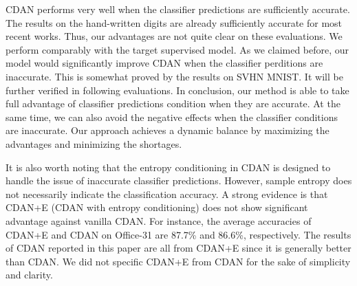 \documentclass[sigconf]{acmart}
\begin{document}
CDAN performs very well when the classifier predictions are sufficiently accurate. The results on the hand-written digits are already sufficiently accurate for most recent works. Thus, our advantages are not quite clear on these evaluations. We perform comparably with the target supervised model. As we claimed before, our model would significantly improve CDAN when the classifier perditions are inaccurate. This is somewhat proved by the results on SVHN MNIST. It will be further verified in following evaluations. In conclusion, our method is able to take full advantage of classifier predictions condition when they are accurate. At the same time, we can also avoid the negative effects when the classifier conditions are inaccurate. Our approach achieves a dynamic balance by maximizing the advantages and minimizing the shortages.


It is also worth noting that the entropy conditioning in CDAN is designed to handle the issue of inaccurate classifier predictions. However, sample entropy does not necessarily indicate the classification accuracy. A strong evidence is that CDAN+E (CDAN with entropy conditioning) does not show significant advantage against vanilla CDAN. For instance, the average accuracies of CDAN+E and CDAN on Office-31 are 87.7\% and 86.6\%, respectively. The results of CDAN reported in this paper are all from CDAN+E since it is generally better than CDAN. We did not specific CDAN+E from CDAN for the sake of simplicity and clarity.
\end{document}
